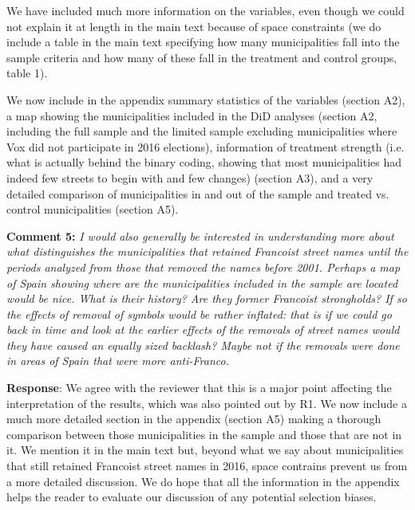 \documentclass[12pt, a4paper, notitlepage]{article}
\begin{document}
We have included much more information on the variables, even though we could not explain it at length in the main text because of space constraints (we do include a table in the main text specifying how many municipalities fall into the sample criteria and how many of these fall in the treatment and control groups, table 1).

We now include in the appendix summary statistics of the variables (section A2), a map showing the municipalities included in the DiD analyses (section A2, including the full sample and the limited sample excluding municipalities where Vox did not participate in 2016 elections), information of treatment strength (i.e. what is actually behind the binary coding, showing that most municipalities had indeed few streets to begin with and few changes) (section A3), and a very detailed comparison of municipalities in and out of the sample and treated vs. control municipalities (section A5).


\textbf{Comment 5:} \textit{I would also generally be interested in understanding more about what distinguishes the municipalities that retained Francoist street names until the periods analyzed from those that removed the names before 2001. Perhaps a map of Spain showing where are the municipalities included in the sample are located would be nice. What is their history? Are they former Francoist strongholds? If so the effects of removal of symbols would be rather inflated: that is if we could go back in time and look at the earlier effects of the removals of street names would they have caused an equally sized backlash? Maybe not if the removals were done in areas of Spain that were more anti-Franco.}

\textbf{Response}: We agree with the reviewer that this is a major point affecting the interpretation of the results, which was also pointed out by R1. We now include a much more detailed section in the appendix (section A5) making a thorough comparison between those municipalities in the sample and those that are not in it. We mention it in the main text but, beyond what we say about municipalities that still retained Francoist street names in 2016, space contrains prevent us from a more detailed discussion.
We do hope that all the information in the appendix helps the reader to evaluate our discussion of any potential selection biases.
\end{document}
